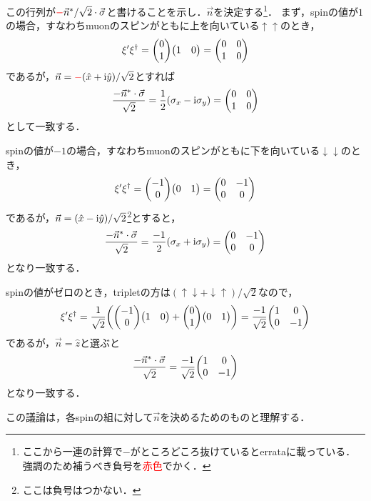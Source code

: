 \begin{itemize}
		この行列が$\textcolor{red}{-}\vec{n}^*/\sqrt{2} \cdot \vec{\sigma}$と書けることを示し．$\vec{n}$を決定する\footnote{ここから一連の計算で$-$がところどころ抜けているとerrataに載っている．強調のため補うべき負号を\textcolor{red}{赤色}でかく．}．
		まず，spinの値が$1$の場合，すなわちmuonのスピンがともに上を向いている$\uparrow\uparrow$のとき，
		\begin{equation}
			\xi'\xi^{\dagger} = \mqty(0\\1)\mqty(1 &  0) = \mqty(0 & 0 \\ 1 & 0)
		\end{equation}
		であるが，$\vec{n} = \textcolor{red}{-}(\hat{x} + \mathrm{i}\hat{y}) / \sqrt{2}$とすれば
		\begin{equation}
			\frac{-\vec{n}^*\cdot\vec{\sigma}}{\sqrt{2}} =  \frac{1}{2}(\sigma_x - \i\sigma_y) = \mqty(0 & 0 \\ 1 & 0)
		\end{equation}
		として一致する．

		spinの値が$-1$の場合，すなわちmuonのスピンがともに下を向いている$\downarrow\downarrow$のとき，
		\begin{equation}
			\xi'\xi^{\dagger} = \mqty(-1 \\ 0)\mqty(0 & 1) = \mqty(0 & -1\\ 0 & 0)
		\end{equation}
		であるが，$\vec{n} = (\hat{x} - \mathrm{i}\hat{y})/\sqrt{2}$\footnote{ここは負号はつかない．}とすると，
		\begin{equation}
			\frac{-\vec{n}^*\cdot \vec{\sigma}}{\sqrt{2}} = \frac{-1}{2}(\sigma_x + \i\sigma_y) = \mqty(0 & -1 \\ 0 & 0)
		\end{equation}
		となり一致する．

		spinの値がゼロのとき，tripletの方は$(\uparrow\downarrow + \downarrow\uparrow)/\sqrt{2}$なので，
		\begin{equation}
			\xi'\xi^{\dagger}  = \frac{1}{\sqrt{2}} \qty( \mqty(-1\\0)\mqty(1 & 0) + \mqty(0 \\ 1)\mqty(0 & 1) ) = \frac{-1}{\sqrt{2}}\mqty(1 & 0 \\ 0 & -1)
		\end{equation}
		であるが，$\vec{n} = \hat{z}$と選ぶと
		\begin{equation}
			\frac{-\vec{n}^{*} \cdot \vec{\sigma}}{\sqrt{2}} = \frac{-1}{\sqrt{2}} \mqty(1 & 0 \\ 0 & -1)
		\end{equation}
		となり一致する．

		この議論は，各spinの組に対して$\vec{n}$を決めるためのものと理解する．
\end{itemize}
